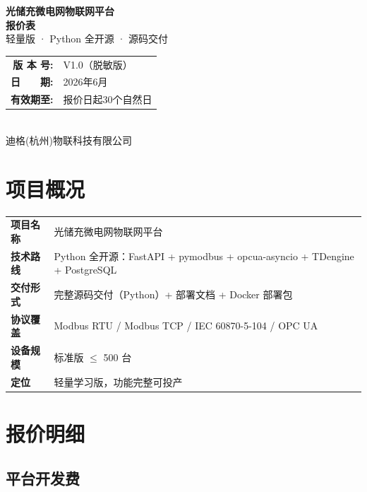 \documentclass[12pt,a4paper]{ctexart}
\begin{document}
\begin{titlepage}
\centering\vspace*{3.5cm}
{\Huge\bfseries\sffamily 光储充微电网物联网平台}\\[0.8cm]
{\LARGE\bfseries 报价表}\\[1.5cm]
{\large 轻量版 · Python 全开源 · 源码交付}\\[2.5cm]
{\large\begin{tabular}{rl}
\textbf{版 本 号:} & V1.0（脱敏版）\\
\textbf{日　　期:} & 2026年6月 \\
\textbf{有效期至:} & 报价日起30个自然日 \\
\end{tabular}}\\[1.5cm]
{\normalsize 迪格(杭州)物联科技有限公司}
\end{titlepage}

\section{项目概况}

\begin{table}[H]\centering
\begin{tabular}{p{2.5cm}p{11cm}}
\toprule
\textbf{项目名称} & 光储充微电网物联网平台 \\
\textbf{技术路线} & Python 全开源：FastAPI + pymodbus + opcua-asyncio + TDengine + PostgreSQL \\
\textbf{交付形式} & 完整源码交付（Python）+ 部署文档 + Docker 部署包 \\
\textbf{协议覆盖} & Modbus RTU / Modbus TCP / IEC 60870-5-104 / OPC UA \\
\textbf{设备规模} & 标准版 $\leq$ 500 台 \\
\textbf{定位} & 轻量学习版，功能完整可投产 \\
\bottomrule
\end{tabular}
\end{table}

\section{报价明细}

\subsection{平台开发费}
\end{document}
